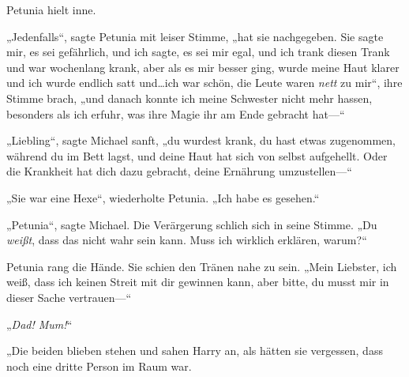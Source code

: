 Petunia hielt inne.

„Jedenfalls“, sagte Petunia mit leiser Stimme, „hat sie nachgegeben. Sie sagte mir, es sei gefährlich, und ich sagte, es sei mir egal, und ich trank diesen Trank und war wochenlang krank, aber als es mir besser ging, wurde meine Haut klarer und ich wurde endlich satt und…ich war schön, die Leute waren \emph{nett} zu mir“, ihre Stimme brach, „und danach konnte ich meine Schwester nicht mehr hassen, besonders als ich erfuhr, was ihre Magie ihr am Ende gebracht hat—“

„Liebling“, sagte Michael sanft, „du wurdest krank, du hast etwas zugenommen, während du im Bett lagst, und deine Haut hat sich von selbst aufgehellt. Oder die Krankheit hat dich dazu gebracht, deine Ernährung umzustellen—“

„Sie war eine Hexe“, wiederholte Petunia. „Ich habe es gesehen.“

„Petunia“, sagte Michael. Die Verärgerung schlich sich in seine Stimme. „Du \emph{weißt}, dass das nicht wahr sein kann. Muss ich wirklich erklären, warum?“

Petunia rang die Hände. Sie schien den Tränen nahe zu sein. „Mein Liebster, ich weiß, dass ich keinen Streit mit dir gewinnen kann, aber bitte, du musst mir in dieser Sache vertrauen—“

„\emph{Dad! Mum!}“

„Die beiden blieben stehen und sahen Harry an, als hätten sie vergessen, dass noch eine dritte Person im Raum war.

